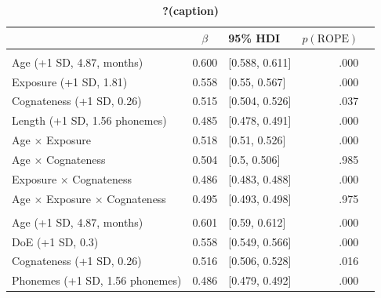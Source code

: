 \documentclass[
]{article}
\begin{document}
\begin{table}

\caption{\label{tbl-coefs-doe}\textbf{?(caption)}}\begin{minipage}[t]{\linewidth}
\subcaption{\label{tbl-coefs-doe-1}}

{\centering 

\begin{tabular}{lclrl}
\toprule
 & $\beta$ & 95\% HDI & $p(\text{ROPE})$ & \\
\midrule
\addlinespace[0.3em]
\multicolumn{5}{l}{\textbf{Model: Exposure}}\\
\hspace{1em}Age (+1 SD, 4.87, months) & 0.600 & {}[0.588, 0.611] & .000 & \\
\hspace{1em}Exposure (+1 SD, 1.81) & 0.558 & {}[0.55, 0.567] & .000 & \\
\hspace{1em}Cognateness (+1 SD, 0.26) & 0.515 & {}[0.504, 0.526] & .037 & \\
\hspace{1em}Length (+1 SD, 1.56 phonemes) & 0.485 & {}[0.478, 0.491] & .000 & \\
\hspace{1em}Age $\times$ Exposure & 0.518 & {}[0.51, 0.526] & .000 & \\
\hspace{1em}Age $\times$ Cognateness & 0.504 & {}[0.5, 0.506] & .985 & \\
\hspace{1em}Exposure $\times$ Cognateness & 0.486 & {}[0.483, 0.488] & .000 & \\
\hspace{1em}Age $\times$ Exposure $\times$ Cognateness & 0.495 & {}[0.493, 0.498] & .975 & \\
\addlinespace[0.3em]
\multicolumn{5}{l}{\textbf{Model: Frequency \& DoE}}\\
\hspace{1em}Age (+1 SD, 4.87, months) & 0.601 & {}[0.59, 0.612] & .000 & \\
\hspace{1em}DoE (+1 SD, 0.3) & 0.558 & {}[0.549, 0.566] & .000 & \\
\hspace{1em}Cognateness (+1 SD, 0.26) & 0.516 & {}[0.506, 0.528] & .016 & \\
\hspace{1em}Phonemes (+1 SD, 1.56 phonemes) & 0.486 & {}[0.479, 0.492] & .000 & \\

\end{tabular}}
\end{minipage}
\end{table}
\end{document}
